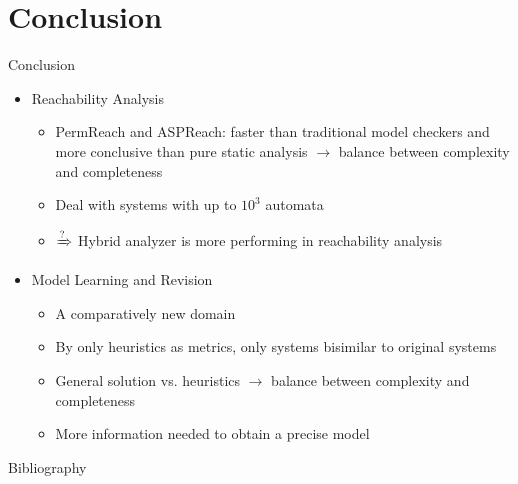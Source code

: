 \documentclass[8pt]{beamer}
\begin{document}





 

 

\section{Conclusion}
\begin{frame}{Conclusion}
\begin{itemize}
    \item Reachability Analysis
    \begin{itemize}
        \item PermReach and ASPReach: faster than traditional model checkers and more conclusive than pure static analysis $\to$ balance between complexity and completeness
        \item Deal with systems with up to $10^3$ automata
        \item $\xRightarrow{\text{?}}$ Hybrid analyzer is more performing in reachability analysis
    \end{itemize}
    \item Model Learning and Revision
    \begin{itemize}
        \item A comparatively new domain
        \item By only heuristics as metrics, only systems bisimilar to original systems
        \item General solution vs. heuristics $\to$ balance between complexity and completeness
        \item More information needed to obtain a precise model 
    \end{itemize}
\end{itemize}
\end{frame}

\begin{frame}{Bibliography}
    
    
\end{frame}
\end{document}
